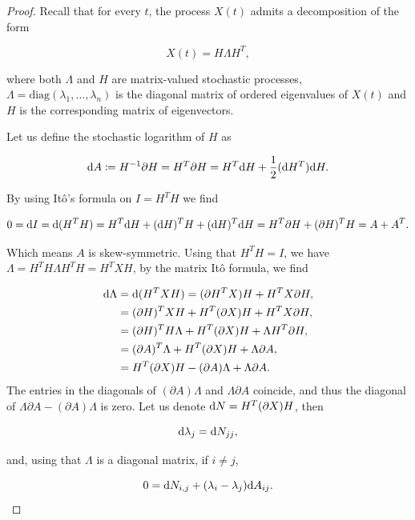 \begin{proof}
    Recall that for every $t$, the process $X(t)$ admits a decomposition of the form 

    \[ X(t) = H \Lambda H^T, \]

    \noindent where both $\Lambda$ and $H$ are matrix-valued stochastic processes, $\Lambda = \mathrm{diag}(\lambda_1, \dots, \lambda_n)$ is the diagonal matrix of ordered eigenvalues of $X(t)$ and $H$ is the corresponding matrix of eigenvectors.

    Let us define the stochastic logarithm of $H$ as

    \begin{equation*}
        \mathrm d A \coloneqq H^{-1} \partial H = H^T \partial H = H^T \mathrm d H + \frac12(\mathrm d H^T)\mathrm d H.
    \end{equation*}

    By using Itô's formula on $I = H^T H$ we find

    \begin{align*}
        0 = \mathrm d I = \mathrm d(H^T H) = H^T\mathrm d H + (\mathrm d H)^T H + (\mathrm d H)^T \mathrm d H = H^T\partial H + (\partial H)^T H = A + A^T.
    \end{align*}

    Which means $A$ is skew-symmetric. Using that $H^T H = I$, we have $\Lambda = H^T H \Lambda H^T H = H^T X H$, by the matrix Itô formula, we find 


    \begin{align*} 
        \mathrm d \Lambda & = \mathrm d(H^TXH) = (\partial H^TX)H + H^TX\partial H,\\ 
        & = (\partial H)^T XH + H^T(\partial X)H + H^T X \partial H,\\
        & = (\partial H)^T H\Lambda + H^T(\partial X) H + \Lambda H^T \partial H,\\
        & = (\partial A)^T \Lambda + H^T(\partial X) H + \Lambda \partial A,\\
        & = H^T(\partial X) H -  (\partial A)\Lambda + \Lambda \partial A.
    \end{align*}
    The entries in the diagonals of $(\partial A)\Lambda$ and $\Lambda\partial A$ coincide, and thus the diagonal of $\Lambda\partial A-(\partial A)\Lambda$ is zero. Let us denote $\mathrm d N = H^T(\partial X) H$, then

    \[ \mathrm d \lambda_j = \mathrm d N_{jj}, \]

    \noindent and, using that $\Lambda$ is a diagonal matrix, if $i\neq j$,

    \[ 0 = \mathrm d N_{i,j} + (\lambda_i - \lambda_j)\mathrm d A_{ij}. \]


\end{proof}
